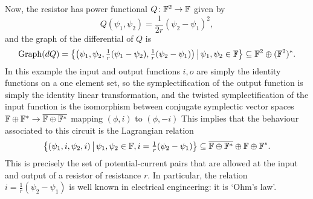 Now, the resistor has power functional $Q{\colon} {\mathbb F}^2 \to {\mathbb F}$ given by
\[   Q(\psi_1,\psi_2) = \frac1{2r}(\psi_2-\psi_1)^2, \]
and the graph of the differential of $Q$ is
\[
  \mathrm{Graph}(dQ) = \big\{\big(\psi_1,\psi_2,
  \tfrac1r(\psi_1-\psi_2),\tfrac1r(\psi_2-\psi_1)\big) \,\big|\, \psi_1,\psi_2 \in
  {\mathbb F}\big\} \subseteq {\mathbb F}^2 \oplus ({\mathbb F}^2)^\ast.
\]
In this example the input and output functions $i,o$ are simply the identity
functions on a one element set, so the symplectification of the output function
is simply the identity linear transformation, and the twisted symplectification
of the input function is the isomorphism  between conjugate
symplectic vector spaces ${\mathbb F}\oplus{\mathbb F}^\ast \to \overline{{\mathbb F}\oplus{\mathbb F}^\ast}$ mapping $(\phi,i)$ to $(\phi,-i)$ This implies that the behaviour associated to this
circuit is the Lagrangian relation
\[
  \big\{(\psi_1,i,\psi_2,i) \,\big|\, \psi_1,\psi_2 \in {\mathbb F}, i =
  \tfrac1r(\psi_2-\psi_1)\big\}\subseteq \overline{{\mathbb F} \oplus {\mathbb F}^\ast} \oplus {\mathbb F}
    \oplus {\mathbb F}^\ast.
\]
This is precisely the set of potential-current pairs that are allowed at the
input and output of a resistor of resistance $r$.  In particular, the relation
$i = \tfrac1r(\psi_2-\psi_1)$ is well known in electrical engineering: it is
`Ohm's law'.

